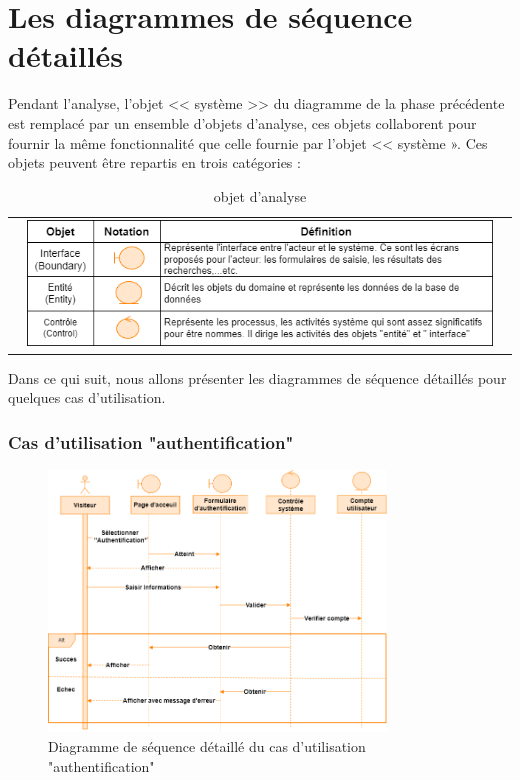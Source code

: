 \documentclass[edit,12pt,a4paper,ChapStyle,oneside,doubleinterligne]{report}
\begin{document}
\section{Les diagrammes de séquence détaillés}
Pendant l'analyse, l'objet << système >> du diagramme de la phase précédente est remplacé par un ensemble d'objets d'analyse, ces objets collaborent pour fournir la même fonctionnalité que celle fournie par l'objet << système ». Ces objets peuvent être repartis en trois catégories :
\begin{table}[h!]
    \centering
    \begin{tabular}{c}
        \centering
        \includegraphics[width=0.95\textwidth]{images/objet analyse.png}
    \end{tabular}
    \caption{objet d'analyse}
    \label{tab:objet analyse}
\end{table}
\newline\newline Dans ce qui suit, nous allons présenter les diagrammes de séquence détaillés pour quelques cas d'utilisation.
\subsubsection{Cas d'utilisation "authentification"}
\begin{figure}[H]\label{fig:Diagramme cas 1d}
\centering
\includegraphics[width=0.8\textwidth]{images/Authentification d.png}
\caption{Diagramme de séquence détaillé du cas d'utilisation "authentification"}
\end{figure}
\end{document}
